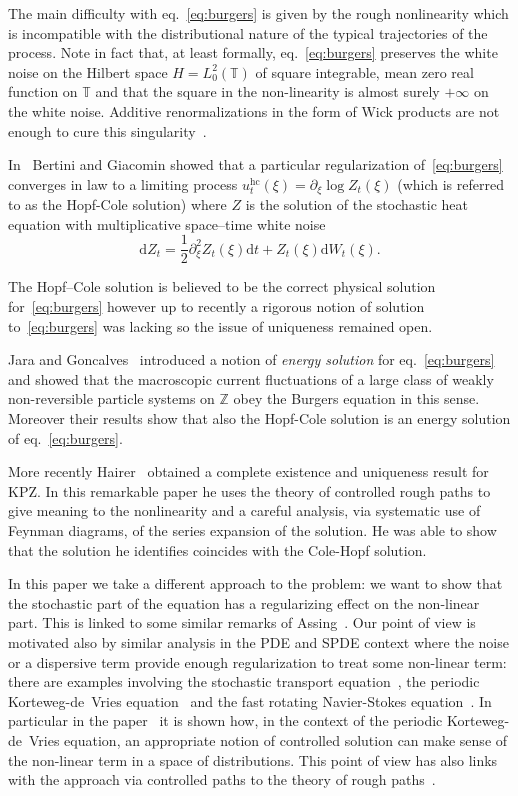 \documentclass[11pt,a4paper,draft,reqno]{amsart}
\newcommand{\TT}{\mathbb{T}}
\newcommand{\ZZ}{\mathbb{Z}}
\newcommand{\dd}{\mathrm{d}}
\newcommand{\Lz}{{L^2_0(\TT)}}
\begin{document}
The main difficulty with eq.~\eqref{eq:burgers} is given by the rough nonlinearity which is incompatible with the distributional nature of the typical trajectories of the process. Note in fact that, at least formally, eq.~\eqref{eq:burgers} preserves the white noise on the Hilbert space $H=\Lz$ of square integrable, mean zero real function on $\TT$ and that the square in the non-linearity is almost surely $+\infty$ on the white noise. Additive renormalizations in the form of Wick products are not enough to cure this singularity~\cite{DDT}.

In~\cite{BG} Bertini and Giacomin showed that a particular regularization of~\eqref{eq:burgers}  converges in law to a limiting process $u^{\textrm{hc}}_t(\xi)=\partial_\xi \log Z_t(\xi)$ (which is referred to as the Hopf-Cole solution)  where $Z$ is the solution of the stochastic heat equation with multiplicative space--time white noise
\begin{equation}
\label{eq:she}
\dd Z_t = \frac12 \partial_\xi^2 Z_t(\xi) \dd t + Z_t(\xi) \dd W_t(\xi) .
\end{equation}

The Hopf--Cole solution is believed to be the correct physical solution for~\eqref{eq:burgers} however up to recently a rigorous notion of solution to~\eqref{eq:burgers} was lacking so the issue of uniqueness remained open. 

 Jara and Goncalves~\cite{JG} introduced a notion of \emph{energy solution} for eq.~\eqref{eq:burgers}  and showed that  the macroscopic current fluctuations of a large class of weakly non-reversible particle systems on $\ZZ$ obey the Burgers equation in this sense. Moreover their results show that also the Hopf-Cole solution is an energy solution of eq.~\eqref{eq:burgers}.

More recently Hairer~\cite{Hairer} obtained a complete existence and uniqueness result for KPZ. In this remarkable paper he uses the theory of controlled rough paths to give meaning to the nonlinearity and a careful analysis,  via systematic use of Feynman diagrams, of the series expansion of the solution. He was able to show that the solution he identifies  coincides  with the Cole-Hopf solution.

In this paper we take a different approach to the problem: we want to show that the stochastic part of the equation has a regularizing effect on the non-linear part. This is linked to some similar remarks of Assing~\cite{assing1,assing2}. Our point of view is motivated also by similar analysis in the PDE and SPDE context where the noise or a dispersive term provide enough regularization to treat some non-linear term: there are examples involving the stochastic transport equation~\cite{FGP}, the periodic Korteweg-de~Vries equation~\cites{kdv,babin-kdv} and the fast rotating Navier-Stokes equation~\cite{babin-ns}. In particular in the paper~\cite{kdv} it is shown how, in the context of the periodic Korteweg-de~Vries equation, an appropriate notion of controlled solution can make sense of the non-linear term in a space of distributions. This point of view has also links with the approach via controlled paths to the theory of rough paths~\cite{controlling}.
\end{document}
